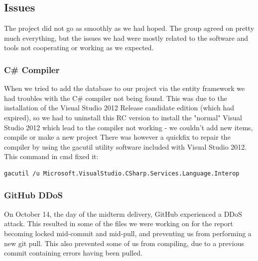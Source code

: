 \subsection{Issues}
The project did not go as smoothly as we had hoped. The group agreed on pretty much everything, but the issues we had were mostly related to the software and tools not cooperating or working as we expected.

\subsubsection{C\# Compiler}
When we tried to add the database to our project via the entity framework we had troubles with the C\# compiler not being found. This was due to the installation of the Visual Studio 2012 Release candidate edition (which had expired), so we had to uninstall this RC version to install the "normal" Visual Studio 2012 which lead to the compiler not working - we couldn't add new items, compile or make a new project
There was however a quickfix to repair the compiler by using the gacutil utility software included with Visual Studio 2012.
This command in cmd fixed it:
\begin{verbatim}
gacutil /u Microsoft.VisualStudio.CSharp.Services.Language.Interop 
\end{verbatim}

\subsubsection{GitHub DDoS}
On October 14, the day of the midterm delivery, GitHub experienced a DDoS attack. This resulted in some of the files we were working on for the report becoming locked mid-commit and mid-pull, and preventing us from performing a new git pull. This also prevented some of us from compiling, due to a previous commit containing errors having been pulled.


